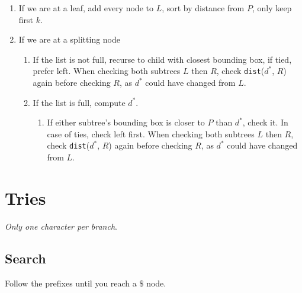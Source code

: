 \documentclass[12pt, letterpaper]{article}
\begin{document}
\begin{multicols*}{3}

        

        \begin{enumerate}
            \item If we are at a leaf, add every node to $L$, sort by distance from $P$, only keep first $k$.
            \item If we are at a splitting node
            \begin{enumerate}
                \item If the list is not full, recurse to child with closest bounding box, if tied, prefer left. When checking both subtrees $L$ then $R$, check \texttt{dist}($d^*$, $R$) again before checking $R$, as $d^*$ could have changed from $L$.
                \item If the list is full, compute $d^*$.
                \begin{enumerate}
                    \item If either subtree's bounding box is closer to $P$ than $d^*$, check it. In case of ties, check left first. When checking both subtrees $L$ then $R$, check \texttt{dist}($d^*$, $R$) again before checking $R$, as $d^*$ could have changed from $L$.
                \end{enumerate}
            \end{enumerate}
        \end{enumerate}

        \section{Tries}
        {\it Only one character per branch}.

        \subsection{Search}
        Follow the prefixes until you reach a $\$$ node.


\end{multicols*}
\end{document}
